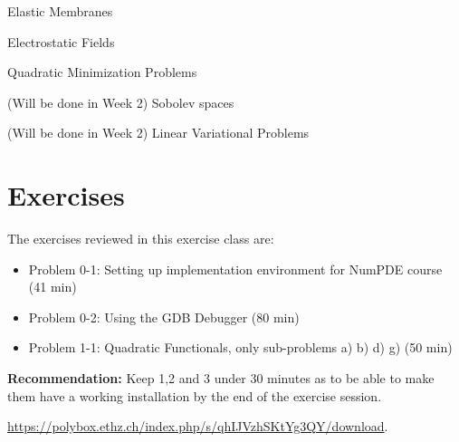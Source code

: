 




\begin{Theory}
\item Elastic Membranes
\item Electrostatic Fields
\item Quadratic Minimization Problems
\item (Will be done in Week 2) Sobolev spaces
\item (Will be done in Week 2) Linear Variational Problems
\end{Theory}

\section*{Exercises}

The exercises reviewed in this exercise class are:
\begin{itemize}
    \item Problem 0-1: Setting up implementation environment for NumPDE course (41 min)
    \item Problem 0-2: Using the GDB Debugger (80 min)
    \item Problem 1-1: Quadratic Functionals, only sub-problems a) b) d) g) (50 min)
\end{itemize}


\textbf{Recommendation:} Keep 1,2 and 3 under 30 minutes as to be able to make them have a working installation by the end of the exercise session.

\tableofcontents

\newpage



\url{https://polybox.ethz.ch/index.php/s/qhIJVzhSKtYg3QY/download}.


